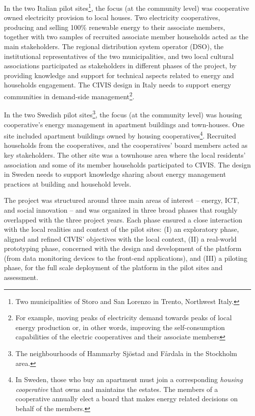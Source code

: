 In the two Italian pilot sites\footnote{Two municipalities of Storo and San Lorenzo in Trento, Northwest Italy.}, the focus (at the community level) was cooperative owned electricity provision to local houses. 
Two electricity cooperatives, producing and 
selling 100\% renewable energy to their associate members, together with two samples of recruited 
associate member households acted as the main stakeholders.
The regional distribution system 
operator (DSO), the institutional representatives of the two municipalities, and two local cultural 
associations participated as stakeholders in different phases of the project, by providing knowledge 
and support for technical aspects related to energy and households engagement.
The CIVIS design in Italy needs to support energy communities in demand-side management\footnote{For example, moving peaks of electricity demand towards peaks of local energy
production or, in other words, improving the self-consumption capabilities of the electric cooperatives and
their associate members}. 
% 

In the two Swedish pilot sites\footnote{The neighbourhoods of Hammarby Sj\"{o}stad and F\aa{}rdala in the Stockholm area.}, the focus (at the community level) was housing cooperative's energy management in apartment buildings and town-houses.  
One site included apartment buildings owned by housing 
cooperatives\footnote{In Sweden, those who buy an apartment must join a corresponding \textit{housing cooperative} that owns and maintains the estates. The 
members of a cooperative annually elect a board that makes energy related decisions on behalf of 
the members.}. Recruited households from the cooperatives, and the cooperatives' board members acted
as key stakeholders. %
The other site was a townhouse area where the 
local residents' association and some of its member households participated to CIVIS.
The design in Sweden needs to support knowledge sharing about energy management practices at building and household levels.

The project was 
structured around three main areas of interest -- energy, ICT, and social innovation 
-- and was organized in three broad phases that roughly overlapped with the three project years.
Each phase ensured a close interaction with the local realities and context of the pilot sites: (I) an 
exploratory phase, aligned and refined CIVIS' objectives with the local context,
(II) a real-world prototyping phase, concerned with the design and development of the platform 
(from data monitoring devices to the front-end applications), and (III) a piloting 
phase, for the full scale deployment of the platform in the pilot sites and 
assessment.

